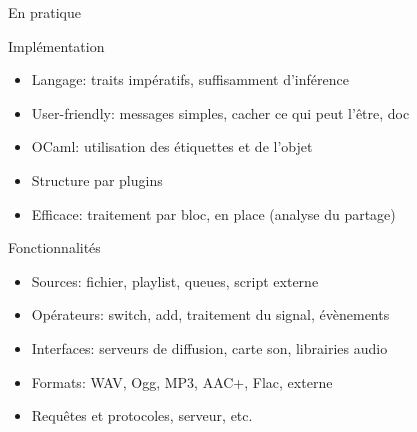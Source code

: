 \documentclass{beamer}
\begin{document}
\begin{frame}{En pratique}

\begin{block}{Implémentation}
\begin{itemize}
 \item Langage: traits impératifs, suffisamment d'inférence
 \item User-friendly:
   messages simples, cacher ce qui peut l'être, doc
 \item OCaml: utilisation des étiquettes et de l'objet
 \item Structure par plugins
 \item Efficace: traitement par bloc, en place (analyse du partage)
\end{itemize}
\end{block}

\vfill

\begin{block}{Fonctionnalités}
\begin{itemize}
\item Sources: fichier, playlist, queues, script externe
\item Opérateurs: switch, add, traitement du signal, évènements
\item Interfaces: serveurs de diffusion, carte son, librairies audio
\item Formats: WAV, Ogg, MP3, AAC+, Flac, externe
\item Requêtes et protocoles, serveur, etc.
\end{itemize}
\end{block}

\end{frame}


\end{document}
